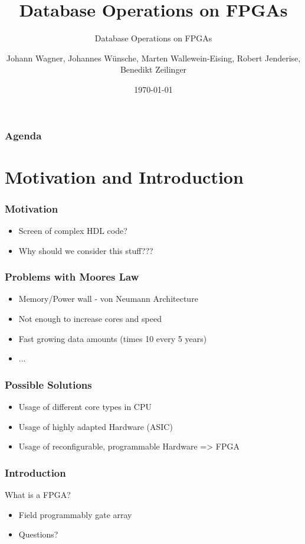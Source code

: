 \documentclass{beamer}
\title{Database Operations on FPGAs}
\subtitle{Database Operations on FPGAs}
\author{Johann Wagner, Johannes Wünsche, Marten Wallewein-Eising, Robert Jenderise, Benedikt Zeilinger}
\date{\today}
\institute{Otto von Guericke University, Magdeburg}
\begin{document}
\begin{frame}[plain]
 \titlepage
\end{frame}

\section[Agenda]{}
\begin{frame}
	\frametitle{Agenda}
	\tableofcontents
\end{frame}

\section{Motivation and Introduction}
\begin{frame}
	\frametitle{Motivation}
	\begin{itemize}
		\item Screen of complex HDL code?
		\item Why should we consider this stuff???
	\end{itemize}
\end{frame}

\begin{frame}
	\frametitle{Problems with Moores Law}
	\begin{itemize}
		\item Memory/Power wall - von Neumann Architecture
		\item Not enough to increase cores and speed
		\item Fast growing data amounts (times 10 every 5 years)
		\item ...
	\end{itemize}
\end{frame}

\begin{frame}
	\frametitle{Possible Solutions}
	\begin{itemize}
		\item Usage of different core types in CPU
		\item Usage of highly adapted Hardware (ASIC)
		\item Usage of reconfigurable, programmable Hardware => FPGA
	\end{itemize}
\end{frame}

\begin{frame}
	\frametitle{Introduction}
	What is a FPGA?
	\begin{itemize}
		\item Field programmably gate array
		\item Questions?
	\end{itemize}
\end{frame}
\end{document}
